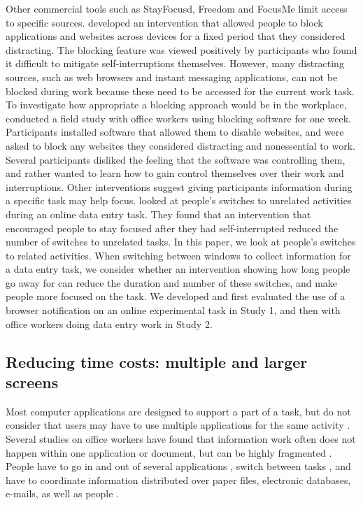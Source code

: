 Other commercial tools such as StayFocusd, Freedom and FocusMe limit access to specific sources. \citet{Kim2017} developed an intervention that allowed people to block applications and websites across devices for a fixed period that they considered distracting. The blocking feature was viewed positively by participants who found it difficult to mitigate self-interruptions themselves. However, many distracting sources, such as web browsers and instant messaging applications, can not be blocked during work because these need to be accessed for the current work task. To investigate how appropriate a blocking approach would be in the workplace, \citet{Mark2018} conducted a field study with office workers using blocking software for one week. Participants installed software that allowed them to disable websites, and were asked to block any websites they considered distracting and nonessential to work. Several participants disliked the feeling that the software was controlling them, and rather wanted to learn how to gain control themselves over their work and interruptions.
Other interventions suggest giving participants information during a specific task may help focus. \citet{Gould2016a} looked at people’s switches to unrelated activities during an online data entry task. They found that an intervention that encouraged people to stay focused after they had self-interrupted reduced the number of switches to unrelated tasks. In this paper, we look at people’s switches to related activities. When switching between windows to collect information for a data entry task, we consider whether an intervention showing how long people go away for can reduce the duration and number of these switches, and make people more focused on the task. We developed and first evaluated the use of a browser notification on an online experimental task in Study 1, and then with office workers doing data entry work in Study 2.

\subsection{Reducing time costs: multiple and larger screens}
Most computer applications are designed to support a part of a task, but do not consider that users may have to use multiple applications for the same activity \citep{Cangiano2009}. Several studies on office workers have found that information work often does not happen within one application or document, but can be highly fragmented \citep{Cangiano2009, Czerwinski2004, Mark2005, Sellberg2014}. People have to go in and out of several applications \citep{Cangiano2009, Iqbal2007}, switch between tasks \citep{Czerwinski2004, Mark2005}, and have to coordinate information distributed over paper files, electronic databases, e-mails, as well as people \citep{Sellberg2014}. 

